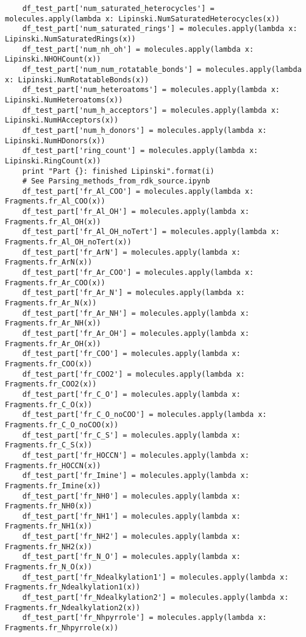 \documentclass[11pt, oneside]{article}   	%
\begin{document}
\begin{lstlisting}
    df_test_part['num_saturated_heterocycles'] = molecules.apply(lambda x: Lipinski.NumSaturatedHeterocycles(x))
    df_test_part['num_saturated_rings'] = molecules.apply(lambda x: Lipinski.NumSaturatedRings(x))
    df_test_part['num_nh_oh'] = molecules.apply(lambda x: Lipinski.NHOHCount(x))
    df_test_part['num_num_rotatable_bonds'] = molecules.apply(lambda x: Lipinski.NumRotatableBonds(x))
    df_test_part['num_heteroatoms'] = molecules.apply(lambda x: Lipinski.NumHeteroatoms(x))
    df_test_part['num_h_acceptors'] = molecules.apply(lambda x: Lipinski.NumHAcceptors(x))
    df_test_part['num_h_donors'] = molecules.apply(lambda x: Lipinski.NumHDonors(x))
    df_test_part['ring_count'] = molecules.apply(lambda x: Lipinski.RingCount(x))
    print "Part {}: finished Lipinski".format(i)
    # See Parsing_methods_from_rdk_source.ipynb
    df_test_part['fr_Al_COO'] = molecules.apply(lambda x: Fragments.fr_Al_COO(x))
    df_test_part['fr_Al_OH'] = molecules.apply(lambda x: Fragments.fr_Al_OH(x))
    df_test_part['fr_Al_OH_noTert'] = molecules.apply(lambda x: Fragments.fr_Al_OH_noTert(x))
    df_test_part['fr_ArN'] = molecules.apply(lambda x: Fragments.fr_ArN(x))
    df_test_part['fr_Ar_COO'] = molecules.apply(lambda x: Fragments.fr_Ar_COO(x))
    df_test_part['fr_Ar_N'] = molecules.apply(lambda x: Fragments.fr_Ar_N(x))
    df_test_part['fr_Ar_NH'] = molecules.apply(lambda x: Fragments.fr_Ar_NH(x))
    df_test_part['fr_Ar_OH'] = molecules.apply(lambda x: Fragments.fr_Ar_OH(x))
    df_test_part['fr_COO'] = molecules.apply(lambda x: Fragments.fr_COO(x))
    df_test_part['fr_COO2'] = molecules.apply(lambda x: Fragments.fr_COO2(x))
    df_test_part['fr_C_O'] = molecules.apply(lambda x: Fragments.fr_C_O(x))
    df_test_part['fr_C_O_noCOO'] = molecules.apply(lambda x: Fragments.fr_C_O_noCOO(x))
    df_test_part['fr_C_S'] = molecules.apply(lambda x: Fragments.fr_C_S(x))
    df_test_part['fr_HOCCN'] = molecules.apply(lambda x: Fragments.fr_HOCCN(x))
    df_test_part['fr_Imine'] = molecules.apply(lambda x: Fragments.fr_Imine(x))
    df_test_part['fr_NH0'] = molecules.apply(lambda x: Fragments.fr_NH0(x))
    df_test_part['fr_NH1'] = molecules.apply(lambda x: Fragments.fr_NH1(x))
    df_test_part['fr_NH2'] = molecules.apply(lambda x: Fragments.fr_NH2(x))
    df_test_part['fr_N_O'] = molecules.apply(lambda x: Fragments.fr_N_O(x))
    df_test_part['fr_Ndealkylation1'] = molecules.apply(lambda x: Fragments.fr_Ndealkylation1(x))
    df_test_part['fr_Ndealkylation2'] = molecules.apply(lambda x: Fragments.fr_Ndealkylation2(x))
    df_test_part['fr_Nhpyrrole'] = molecules.apply(lambda x: Fragments.fr_Nhpyrrole(x))

\end{lstlisting}
\end{document}
